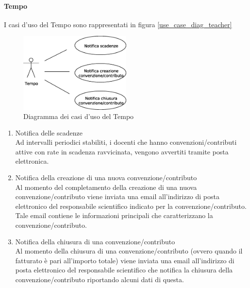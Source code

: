 \paragraph{Tempo}
I casi d'uso del Tempo sono rappresentati in figura \ref{use_case_diag_teacher}
\begin{figure}[h]
  \caption{Diagramma dei casi d'uso del Tempo}
  \label{use_case_diag_time}
  \centering
\includegraphics[width = 0.5\textwidth]{images/casi_uso_tempo.eps}
\end{figure}
\begin{enumerate}
 \item Notifica delle scadenze\\
 
    Ad intervalli periodici stabiliti, i docenti che hanno convenzioni/contributi attive con rate in scadenza ravvicinata, vengono avvertiti tramite posta elettronica.
  
 
 \item Notifica della creazione di una nuova convenzione/contributo\\
 
    Al momento del completamento della creazione di una nuova convenzione/contributo viene inviata una email all'indirizzo di posta elettronico del responsabile scientifico indicato per la convenzione/contributo. Tale email contiene
    le informazioni principali che caratterizzano la convenzione/contributo.
  
  
 \item Notifica della chiusura di una convenzione/contributo\\
 
    Al momento della chiusura di una convenzione/contributo (ovvero quando il fatturato è pari all'importo totale) viene inviata una email all'indirizzo di posta elettronico del responsabile scientifico che notifica la chiusura della
    convenzione/contributo riportando alcuni dati di questa.
\end{enumerate}




